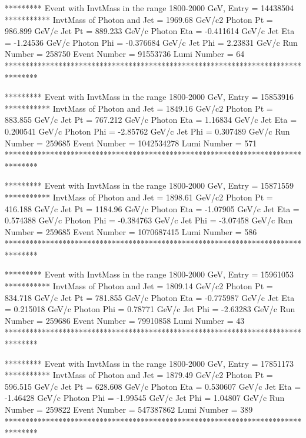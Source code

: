                                                                      
********* Event with InvtMass in the range 1800-2000 GeV, Entry = 14438504 ***********
InvtMass of Photon and Jet = 1969.68 GeV/c2
Photon Pt = 986.899 GeV/c
Jet Pt = 889.233 GeV/c
Photon Eta = -0.411614 GeV/c
Jet Eta = -1.24536 GeV/c
Photon Phi = -0.376684 GeV/c
Jet Phi = 2.23831 GeV/c
Run Number = 258750
Event Number = 91553736
Lumi Number = 64
********************************************************************************
                                                                     
                                                                     
********* Event with InvtMass in the range 1800-2000 GeV, Entry = 15853916 ***********
InvtMass of Photon and Jet = 1849.16 GeV/c2
Photon Pt = 883.855 GeV/c
Jet Pt = 767.212 GeV/c
Photon Eta = 1.16834 GeV/c
Jet Eta = 0.200541 GeV/c
Photon Phi = -2.85762 GeV/c
Jet Phi = 0.307489 GeV/c
Run Number = 259685
Event Number = 1042534278
Lumi Number = 571
********************************************************************************
                                                                     
                                                                     
********* Event with InvtMass in the range 1800-2000 GeV, Entry = 15871559 ***********
InvtMass of Photon and Jet = 1898.61 GeV/c2
Photon Pt = 416.188 GeV/c
Jet Pt = 1184.96 GeV/c
Photon Eta = -1.07905 GeV/c
Jet Eta = 0.574388 GeV/c
Photon Phi = -0.384763 GeV/c
Jet Phi = -3.07458 GeV/c
Run Number = 259685
Event Number = 1070687415
Lumi Number = 586
********************************************************************************
                                                                     
                                                                     
********* Event with InvtMass in the range 1800-2000 GeV, Entry = 15961053 ***********
InvtMass of Photon and Jet = 1809.14 GeV/c2
Photon Pt = 834.718 GeV/c
Jet Pt = 781.855 GeV/c
Photon Eta = -0.775987 GeV/c
Jet Eta = 0.215018 GeV/c
Photon Phi = 0.78771 GeV/c
Jet Phi = -2.63283 GeV/c
Run Number = 259686
Event Number = 79910858
Lumi Number = 43
********************************************************************************
                                                                     
                                                                     
********* Event with InvtMass in the range 1800-2000 GeV, Entry = 17851173 ***********
InvtMass of Photon and Jet = 1879.49 GeV/c2
Photon Pt = 596.515 GeV/c
Jet Pt = 628.608 GeV/c
Photon Eta = 0.530607 GeV/c
Jet Eta = -1.46428 GeV/c
Photon Phi = -1.99545 GeV/c
Jet Phi = 1.04807 GeV/c
Run Number = 259822
Event Number = 547387862
Lumi Number = 389
********************************************************************************
                                                                     
